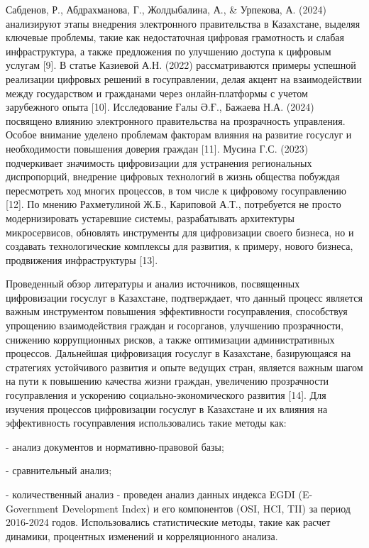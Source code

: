 \begin{multicols}{2}
Сабденов, Р., Абдрахманова, Г., Жолдыбалина, А., \& Урпекова, А. (2024)
анализируют этапы внедрения электронного правительства в Казахстане,
выделяя ключевые проблемы, такие как недостаточная цифровая грамотность
и слабая инфраструктура, а также предложения по улучшению доступа к
цифровым услугам {[}9{]}. В статье Казиевой А.Н. (2022) рассматриваются
примеры успешной реализации цифровых решений в госуправлении, делая
акцент на взаимодействии между государством и гражданами через
онлайн-платформы с учетом зарубежного опыта {[}10{]}. Исследование Ғалы
Ә.Ғ., Бажаева Н.А. (2024) посвящено влиянию электронного правительства
на прозрачность управления. Особое внимание уделено проблемам факторам
влияния на развитие госуслуг и необходимости повышения доверия граждан
{[}11{]}. Мусина Г.С. (2023) подчеркивает значимость цифровизации для
устранения региональных диспропорций, внедрение цифровых технологий в
жизнь общества побуждая пересмотреть ход многих процессов, в том числе к
цифровому госуправлению {[}12{]}. По мнению Рахметулиной Ж.Б., Кариповой
А.Т., потребуется не просто модернизировать устаревшие системы,
разрабатывать архитектуры микросервисов, обновлять инструменты для
цифровизации своего бизнеса, но и создавать технологические комплексы
для развития, к примеру, нового бизнеса, продвижения инфраструктуры
{[}13{]}.

Проведенный обзор литературы и анализ источников, посвященных
цифровизации госуслуг в Казахстане, подтверждает, что данный процесс
является важным инструментом повышения эффективности госуправления,
способствуя упрощению взаимодействия граждан и госорганов, улучшению
прозрачности, снижению коррупционных рисков, а также оптимизации
административных процессов. Дальнейшая цифровизация госуслуг в
Казахстане, базирующаяся на стратегиях устойчивого развития и опыте
ведущих стран, является важным шагом на пути к повышению качества жизни
граждан, увеличению прозрачности госуправления и ускорению
социально-экономического развития {[}14{]}. Для изучения процессов
цифровизации госуслуг в Казахстане и их влияния на эффективность
госуправления использовались такие методы как:

- анализ документов и нормативно-правовой базы;

- сравнительный анализ;

- количественный анализ - проведен анализ данных индекса EGDI
(E-Government Development Index) и его компонентов (OSI, HCI, TII) за
период 2016-2024 годов. Использовались статистические методы, такие как
расчет динамики, процентных изменений и корреляционного анализа.
\end{multicols}

